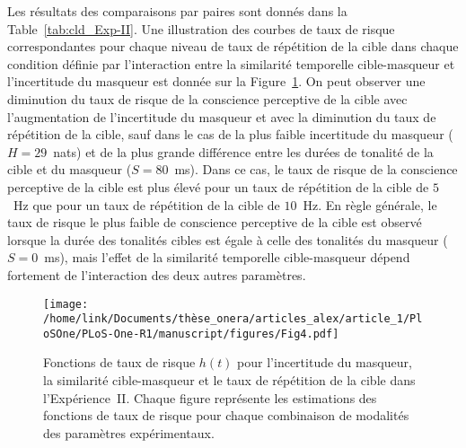 Les résultats des comparaisons par paires sont donnés dans la Table~\ref{tab:cld_Exp-II}. 
Une illustration des courbes de taux de risque correspondantes pour chaque niveau de taux de répétition de la cible dans chaque condition définie par l'interaction entre la similarité temporelle cible-masqueur et l'incertitude du masqueur est donnée sur la Figure~\ref{fig:hr_Exp-II}. 
On peut observer une diminution du taux de risque de la conscience perceptive de la cible avec l'augmentation de l'incertitude du masqueur et avec la diminution du taux de répétition de la cible, sauf dans le cas de la plus faible incertitude du masqueur ($H=29$~nats) et de la plus grande différence entre les durées de tonalité de la cible et du masqueur ($S=80$~ms). 
Dans ce cas, le taux de risque de la conscience perceptive de la cible est plus élevé pour un taux de répétition de la cible de $5$~Hz que pour un taux de répétition de la cible de $10$~Hz. 
En règle générale, le taux de risque le plus faible de conscience perceptive de la cible est observé lorsque la durée des tonalités cibles est égale à celle des tonalités du masqueur ($S=0$~ms), mais l'effet de la similarité temporelle cible-masqueur dépend fortement de l'interaction des deux autres paramètres. 

\begin{figure}[!t]
\texttt{[image: /home/link/Documents/thèse\_onera/articles\_alex/article\_1/PloSOne/PLoS-One-R1/manuscript/figures/Fig4.pdf]}
\caption[Fonctions de taux de risque $h(t)$ pour l'Expérience~II]{Fonctions de taux de risque $h(t)$ pour l'incertitude du masqueur, la similarité cible-masqueur et le taux de répétition de la cible dans l'Expérience~II. 
Chaque figure représente les estimations des fonctions de taux de risque pour chaque combinaison de modalités des paramètres expérimentaux.} 
\label{fig:hr_Exp-II}
\end{figure}

